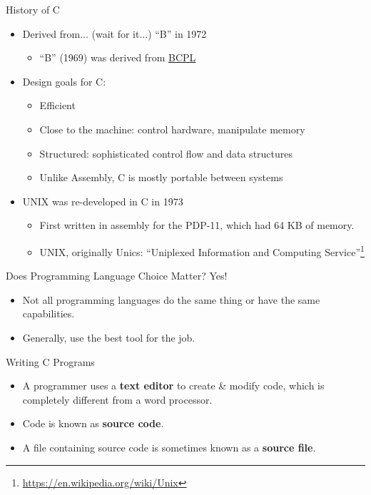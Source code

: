 \documentclass[graphics]{beamer}
\begin{document}
\begin{frame}{History of C}
    \begin{itemize}
        \item Derived from... (wait for it...) ``B'' in 1972
        \begin{itemize}
            \item ``B'' (1969) was derived from \href{https://en.wikipedia.org/wiki/BCPL}{BCPL}
        \end{itemize}
        \item Design goals for C:
        \begin{itemize}
            \item Efficient
            \item Close to the machine: control hardware, manipulate memory
            \item Structured: sophisticated control flow and data structures
            \item Unlike Assembly, C is mostly portable between systems
        \end{itemize}
        \item UNIX was re-developed in C in 1973
        \begin{itemize}
            \item First written in assembly for the PDP-11, which had 64 KB of memory.
            \item UNIX, originally Unics: ``Uniplexed Information and Computing Service''\footnote{\url{https://en.wikipedia.org/wiki/Unix}}
        \end{itemize}
    \end{itemize}
\end{frame}

\begin{frame}{Does Programming Language Choice Matter?}
    Yes!
    \begin{itemize}
        \item Not all programming languages do the same thing or have the same capabilities.
        \item Generally, use the best tool for the job.
    \end{itemize}
\end{frame}

\begin{frame}{Writing C Programs}
    \begin{itemize}
        \item A programmer uses a \textbf{text editor} to create \& modify code, which is completely different from a word processor.
        \item Code is known as \textbf{source code}.
        \item A file containing source code is sometimes known as a \textbf{source file}.
    \end{itemize}
\end{frame}
\end{document}
